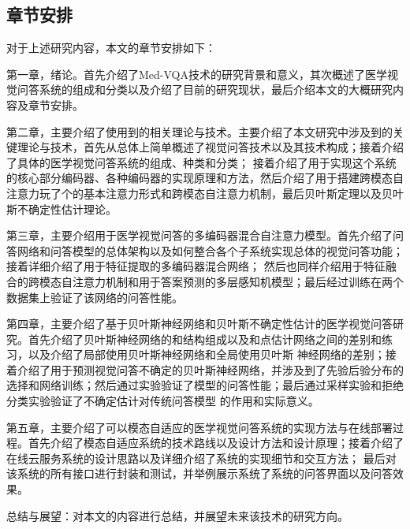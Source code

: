 \subsection{章节安排}
对于上述研究内容，本文的章节安排如下：

第一章，绪论。首先介绍了Med-VQA技术的研究背景和意义，其次概述了医学视觉问答系统的组成和分类以及介绍了目前的研究现状，最后介绍本文的大概研究内容及章节安排。

第二章，主要介绍了使用到的相关理论与技术。主要介绍了本文研究中涉及到的关键理论与技术，首先从总体上简单概述了视觉问答技术以及其技术构成；接着介绍了具体的医学视觉问答系统的组成、种类和分类；
接着介绍了用于实现这个系统的核心部分编码器、各种编码器的实现原理和方法，然后介绍了用于搭建跨模态自注意力玩了个的基本注意力形式和跨模态自注意力机制，最后贝叶斯定理以及贝叶斯不确定性估计理论。

第三章，主要介绍用于医学视觉问答的多编码器混合自注意力模型。首先介绍了问答网络和问答模型的总体架构以及如何整合各个子系统实现总体的视觉问答功能；接着详细介绍了用于特征提取的多编码器混合网络；
然后也同样介绍用于特征融合的跨模态自注意力机制和用于答案预测的多层感知机模型；最后经过训练在两个数据集上验证了该网络的问答性能。

第四章，主要介绍了基于贝叶斯神经网络和贝叶斯不确定性估计的医学视觉问答研究。首先介绍了贝叶斯神经网络的和结构组成以及和点估计网络之间的差别和练习，以及介绍了局部使用贝叶斯神经网络和全局使用贝叶斯
神经网络的差别；接着介绍了用于预测视觉问答不确定的贝叶斯神经网络，并涉及到了先验后验分布的选择和网络训练；然后通过实验验证了模型的问答性能；最后通过采样实验和拒绝分类实验验证了不确定估计对传统问答模型
的作用和实际意义。

第五章，主要介绍了可以模态自适应的医学视觉问答系统的实现方法与在线部署过程。首先介绍了模态自适应系统的技术路线以及设计方法和设计原理；接着介绍了在线云服务系统的设计思路以及详细介绍了系统的实现细节和交互方法；
最后对该系统的所有接口进行封装和测试，并举例展示系统了系统的问答界面以及问答效果。

总结与展望：对本文的内容进行总结，并展望未来该技术的研究方向。


